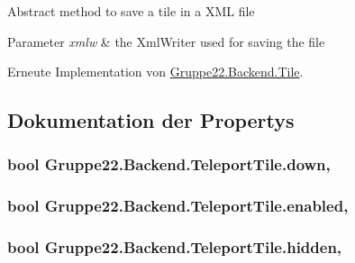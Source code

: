 Abstract method to save a tile in a X\-M\-L file 


\begin{DoxyParams}{Parameter}
{\em xmlw} & the Xml\-Writer used for saving the file\\
\hline
\end{DoxyParams}


Erneute Implementation von \hyperlink{class_gruppe22_1_1_backend_1_1_tile_a109ab3e77ffca9d44c95a711af3491dc}{Gruppe22.\-Backend.\-Tile}.



\subsection{Dokumentation der Propertys}
\hypertarget{class_gruppe22_1_1_backend_1_1_teleport_tile_a0730a9a54b6e01a66e2db7db4e33de49}{
\subsubsection[{down}]{\setlength{\rightskip}{0pt plus 5cm}bool Gruppe22.\-Backend.\-Teleport\-Tile.\-down\hspace{0.3cm}{\ttfamily [get]}, {\ttfamily [set]}}}\label{class_gruppe22_1_1_backend_1_1_teleport_tile_a0730a9a54b6e01a66e2db7db4e33de49}
\hypertarget{class_gruppe22_1_1_backend_1_1_teleport_tile_ac83bb7b79fd78d4c91114629c5306cc8}{
\subsubsection[{enabled}]{\setlength{\rightskip}{0pt plus 5cm}bool Gruppe22.\-Backend.\-Teleport\-Tile.\-enabled\hspace{0.3cm}{\ttfamily [get]}, {\ttfamily [set]}}}\label{class_gruppe22_1_1_backend_1_1_teleport_tile_ac83bb7b79fd78d4c91114629c5306cc8}
\hypertarget{class_gruppe22_1_1_backend_1_1_teleport_tile_abee7ec642fbd77e0d6b16105aa42b589}{
\subsubsection[{hidden}]{\setlength{\rightskip}{0pt plus 5cm}bool Gruppe22.\-Backend.\-Teleport\-Tile.\-hidden\hspace{0.3cm}{\ttfamily [get]}, {\ttfamily [set]}}}\label{class_gruppe22_1_1_backend_1_1_teleport_tile_abee7ec642fbd77e0d6b16105aa42b589}
